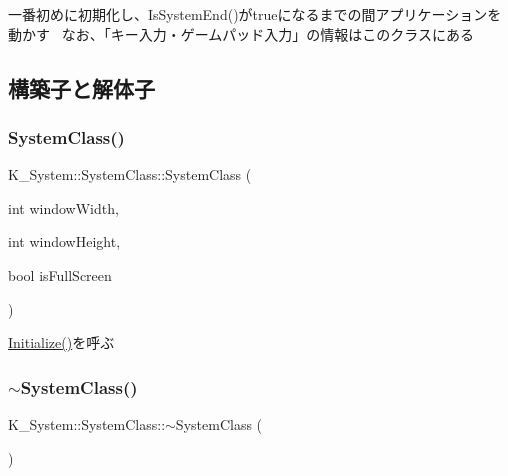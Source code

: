 一番初めに初期化し、\+Is\+System\+End()がtrueになるまでの間アプリケーションを動かす~\newline
なお、「キー入力・ゲームパッド入力」の情報はこのクラスにある 

\subsection{構築子と解体子}
\mbox{\label{class_k___system_1_1_system_class_a0202cc960e52ef4b51f0decb3c3fb35d}} 
\subsubsection{\texorpdfstring{System\+Class()}{SystemClass()}}
{\footnotesize\ttfamily K\+\_\+\+System\+::\+System\+Class\+::\+System\+Class (\begin{DoxyParamCaption}\item[{int}]{window\+Width,  }\item[{int}]{window\+Height,  }\item[{bool}]{is\+Full\+Screen }\end{DoxyParamCaption})}



\mbox{\hyperlink{class_k___system_1_1_system_class_a2db013b3b45f150df5355fd5265c8705}{Initialize()}}を呼ぶ 

\mbox{\label{class_k___system_1_1_system_class_a5bdd9b6b328727510a660dc7ab9ea8ac}} 
\subsubsection{\texorpdfstring{$\sim$\+System\+Class()}{~SystemClass()}}
{\footnotesize\ttfamily K\+\_\+\+System\+::\+System\+Class\+::$\sim$\+System\+Class (\begin{DoxyParamCaption}{ }\end{DoxyParamCaption})}



